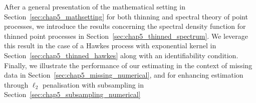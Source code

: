 After a general presentation of the mathematical setting in Section~\ref{sec:chap5_mathsetting} for both thinning and spectral theory of point processes, 
we introduce the results concerning the spectral density function for thinned point processes in Section~\ref{sec:chap5_thinned_spectrum}.
We leverage this result in the case of a Hawkes process with exponential kernel in Section~\ref{sec:chap5_thinned_hawkes} along with an identifiability condition.
Finally, we illustrate the performance of our estimating in the context of missing data in Section~\ref{sec:chap5_missing_numerical}, and for enhancing estimation through $\ell_2$ penalisation with subsampling in Section~\ref{sec:chap5_subsampling_numerical}



    



